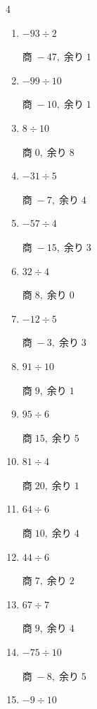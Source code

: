 \begin{multicols}{4}
\begin{enumerate}
        $商\; 19,\; 余り\; 0$

  \item $-93 \div 2$

        $商\; -47,\; 余り\; 1$

  \item $-99 \div 10$

        $商\; -10,\; 余り\; 1$

  \item $8 \div 10$

        $商\; 0,\; 余り\; 8$

  \item $-31 \div 5$

        $商\; -7,\; 余り\; 4$

  \item $-57 \div 4$

        $商\; -15,\; 余り\; 3$

  \item $32 \div 4$

        $商\; 8,\; 余り\; 0$

  \item $-12 \div 5$

        $商\; -3,\; 余り\; 3$

  \item $91 \div 10$

        $商\; 9,\; 余り\; 1$

  \item $95 \div 6$

        $商\; 15,\; 余り\; 5$

  \item $81 \div 4$

        $商\; 20,\; 余り\; 1$

\columnbreak %

  \item $64 \div 6$

        $商\; 10,\; 余り\; 4$

  \item $44 \div 6$

        $商\; 7,\; 余り\; 2$

  \item $67 \div 7$

        $商\; 9,\; 余り\; 4$

  \item $-75 \div 10$

        $商\; -8,\; 余り\; 5$

  \item $-9 \div 10$


\end{enumerate}
\end{multicols}
